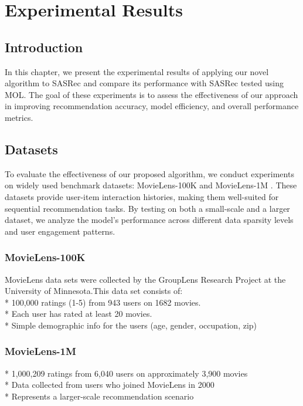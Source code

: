 \chapter{Experimental Results}
\pagestyle{fancy}
\pagestyle{fancy}\chead{} \pagestyle{fancy}\rhead{}
\pagestyle{fancy} 
\pagestyle{fancy}\cfoot{} \pagestyle{fancy}\rfoot{\thepage}
\section{Introduction}\label{start6}
In this chapter, we present the experimental results of applying our novel algorithm to SASRec and compare its performance with SASRec tested using MOL. The goal of these experiments is to assess the effectiveness of our approach in improving recommendation accuracy, model efficiency, and overall performance metrics.


\section{ Datasets}
To evaluate the effectiveness of our proposed algorithm, we conduct experiments on widely used benchmark datasets: MovieLens-100K and MovieLens-1M \cite{Harper2015}. These datasets provide user-item interaction histories, making them well-suited for sequential recommendation tasks. By testing on both a small-scale and a larger dataset, we analyze the model’s performance across different data sparsity levels and user engagement patterns.
\subsection{MovieLens-100K}
MovieLens data sets were collected by the GroupLens Research Project
at the University of Minnesota.This data set consists of:\\
* 100,000 ratings (1-5) from 943 users on 1682 movies. \\
* Each user has rated at least 20 movies. \\
* Simple demographic info for the users (age, gender, occupation, zip)
\subsection{MovieLens-1M}
* 1,000,209 ratings from 6,040 users on approximately 3,900 movies \\
* Data collected from users who joined MovieLens in 2000 \\
* Represents a larger-scale recommendation scenario \\
